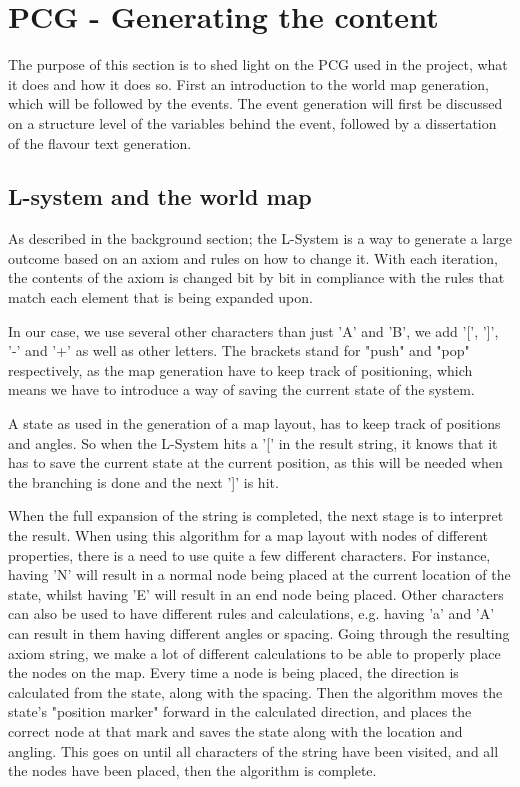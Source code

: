 \section{PCG - Generating the content}
The purpose of this section is to shed light on the PCG used in the project, what it does and how it does so. First an introduction to the world map generation, which will be followed by the events.
The event generation will first be discussed on a structure level of the variables behind the event, followed by a dissertation of the flavour text generation.

\subsection{L-system and the world map}
\label{sec:lsys}
As described in the background section; the L-System is a way to generate a large outcome based on an axiom and rules on how to change it. With each iteration, the contents of the axiom is changed bit by bit in compliance with the rules that match each element that is being expanded upon.

In our case, we use several other characters than just 'A' and 'B', we add '[', ']', '-' and '+' as well as other letters. The brackets stand for "push" and "pop" respectively, as the map generation have to keep track of positioning, which means we have to introduce a way of saving the current state of the system.

A state as used in the generation of a map layout, has to keep track of positions and angles. So when the L-System hits a '[' in the result string, it knows that it has to save the current state at the current position, as this will be needed when the branching is done and the next ']' is hit. 

When the full expansion of the string is completed, the next stage is to interpret the result. When using this algorithm for a map layout with nodes of different properties, there is a need to use quite a few different characters. For instance, having 'N' will result in a normal node being placed at the current location of the state, whilst having 'E' will result in an end node being placed. Other characters can also be used to have different rules and calculations, e.g. having 'a' and 'A' can result in them having different angles or spacing.
Going through the resulting axiom string, we make a lot of different calculations to be able to properly place the nodes on the map. Every time a node is being placed, the direction is calculated from the state, along with the spacing. Then the algorithm moves the state's "position marker" forward in the calculated direction, and places the correct node at that mark and saves the state along with the location and angling.
This goes on until all characters of the string have been visited, and all the nodes have been placed, then the algorithm is complete.

